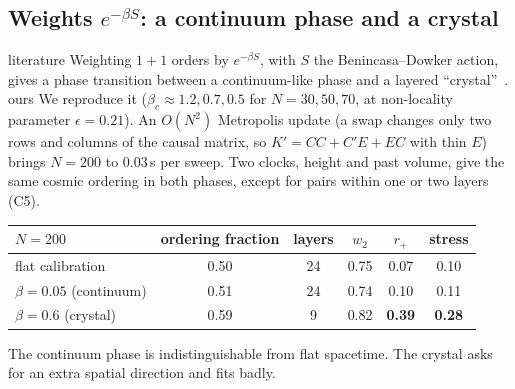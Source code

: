 \documentclass[11pt,a4paper]{article}
\newcommand{\tagbox}[2]{\textsf{\scriptsize\colorbox{#1!12}{\textcolor{#1!70!black}{#2}}}}
\newcommand{\lit}{\tagbox{blue}{literature}}
\newcommand{\ours}{\tagbox{orange}{ours}}
\begin{document}
\subsection{Weights $e^{-\beta S}$: a continuum phase and a crystal}
\lit{} Weighting $1+1$ orders by $e^{-\beta S}$, with $S$ the Benincasa--Dowker action, gives a phase transition between a continuum-like phase and a layered ``crystal''~\cite{Surya12,BHS08,GOS18}. \ours{} We reproduce it ($\beta_c\approx1.2,0.7,0.5$ for $N=30,50,70$, at non-locality parameter $\epsilon=0.21$). An $O(N^2)$ Metropolis update (a swap changes only two rows and columns of the causal matrix, so $K'=CC+C'E+EC$ with thin $E$) brings $N=200$ to $0.03$\,s per sweep. Two clocks, height and past volume, give the same cosmic ordering in both phases, except for pairs within one or two layers (C5).
\begin{center}\small
\begin{tabular}{@{}lccccc@{}}
\toprule
$N=200$ & ordering fraction & layers & $w_2$ & $r_+$ & stress\\
\midrule
flat calibration & 0.50 & 24 & 0.75 & 0.07 & 0.10\\
$\beta=0.05$ (continuum) & 0.51 & 24 & 0.74 & 0.10 & 0.11\\
$\beta=0.6$ (crystal) & 0.59 & 9 & 0.82 & \textbf{0.39} & \textbf{0.28}\\
\bottomrule
\end{tabular}
\end{center}
The continuum phase is indistinguishable from flat spacetime. The crystal asks for an extra spatial direction and fits badly.
\end{document}
